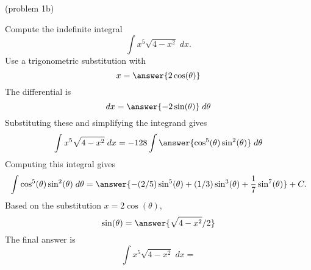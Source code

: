 \documentclass{ximera}
\begin{document}
\begin{problem}(problem 1b)

Compute the indefinite integral
\[
\int   x^5 \sqrt{4-x^2} \; dx.
\]
Use a trigonometric substitution with\\
\[
x = \answer{2\cos(\theta)}
\]
The differential is\\
\[
dx = \answer{-2\sin(\theta)} \; d\theta
\]
Substituting these and simplifying the integrand gives\\
\[
\int   x^5\sqrt{4 - x^2}\; dx = -128\int \answer{\cos^5(\theta)\sin^2(\theta)} \; d\theta
\]
Computing this integral gives
\[
\int \cos^5(\theta)\sin^2(\theta) \; d\theta = \answer{-(2/5)\sin^5(\theta) + (1/3)\sin^3(\theta) +\frac17 \sin^7(\theta)} + C.
\]
Based on the substitution $x = 2\cos(\theta)$, \\
\[
\sin(\theta) = \answer{\sqrt{4 - x^2}/2}
\]
The final answer is
\[
\int   x^5\sqrt{4 -  x^2}\; dx = 
\]
\begin{center}
\begin{multipleChoice}
\end{multipleChoice}
\end{center}

\end{problem}
\end{document}
